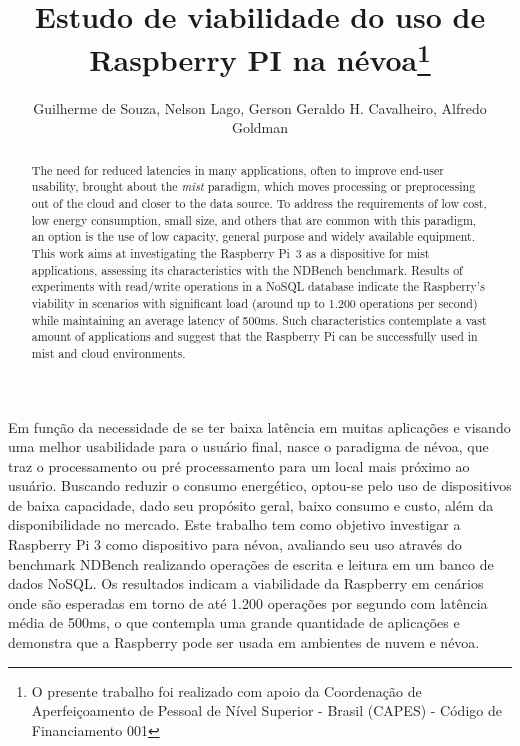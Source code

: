 \documentclass[12pt,english,brazil]{article}
\title{Estudo de viabilidade do uso de Raspberry PI na névoa\thanks{O presente trabalho foi realizado com apoio da Coordenação de Aperfeiçoamento de Pessoal de Nível Superior - Brasil (CAPES) - Código de Financiamento 001}}
\author{Guilherme de Souza\inst{1}, Nelson Lago\inst{2}, Gerson Geraldo H. Cavalheiro\inst{1}, Alfredo Goldman\inst{2}}
\begin{document}
 

\maketitle
    
\en
\begin{abstract}

The need for reduced latencies in many applications, often to improve end-user usability, brought about the \emph{mist} paradigm, which moves processing or preprocessing out of the cloud and closer to the data source. To address the requirements of low cost, low energy consumption, small size, and others that are common with this paradigm, an option is the use of low capacity, general purpose and widely available equipment. This work aims at investigating the Raspberry Pi~3 as a dispositive for mist applications, assessing its characteristics with the NDBench benchmark. Results of experiments with read/write operations in a NoSQL database indicate the Raspberry's viability in scenarios with significant load (around up to 1.200 operations per second) while maintaining an average latency of 500ms. Such characteristics contemplate a vast amount of applications and suggest that the Raspberry Pi can be successfully used in mist and cloud environments.

\end{abstract}

\br
\begin{resumo} 

Em função da necessidade de se ter baixa latência em muitas aplicações e visando uma melhor usabilidade para o usuário final, nasce o paradigma de névoa, que traz o processamento ou pré processamento para um local mais próximo ao usuário.
Buscando reduzir o consumo energético, optou-se pelo uso de dispositivos de baixa capacidade, dado seu propósito geral, baixo consumo e custo, além da disponibilidade no mercado. Este trabalho tem como objetivo investigar a Raspberry Pi 3 como dispositivo para névoa, avaliando seu uso através do benchmark NDBench realizando operações de escrita e leitura em um banco de dados NoSQL. Os resultados indicam a viabilidade da Raspberry em cenários onde são esperadas em torno de até 1.200 operações por segundo com latência média de 500ms, o que contempla uma grande quantidade de aplicações e demonstra que a Raspberry pode ser usada em ambientes de nuvem e névoa.

\end{resumo}
\end{document}
